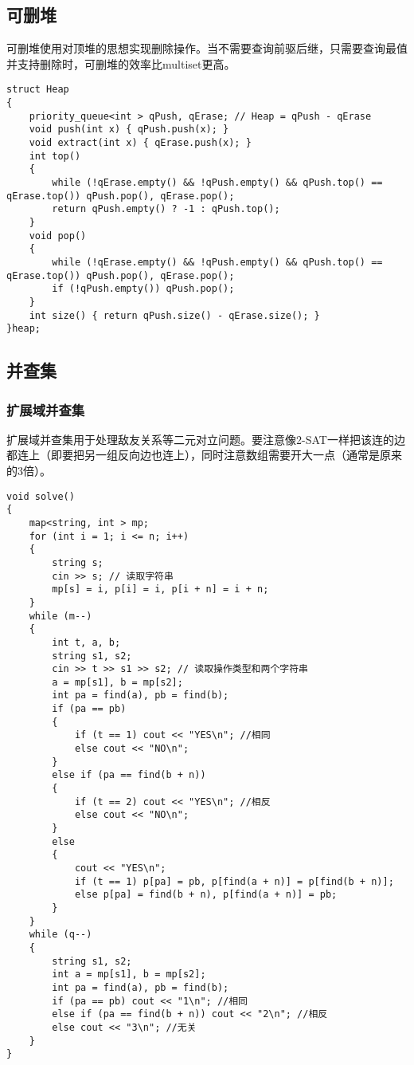 \documentclass[a4paper, fontset=none]{ctexart}
\begin{document}
\subsection{可删堆}

可删堆使用对顶堆的思想实现删除操作。当不需要查询前驱后继，只需要查询最值并支持删除时，可删堆的效率比multiset更高。
\begin{verbatim}
struct Heap
{
    priority_queue<int > qPush, qErase; // Heap = qPush - qErase
    void push(int x) { qPush.push(x); }
    void extract(int x) { qErase.push(x); }
    int top()
    {
        while (!qErase.empty() && !qPush.empty() && qPush.top() == qErase.top()) qPush.pop(), qErase.pop();
        return qPush.empty() ? -1 : qPush.top();
    }
    void pop()
    {
        while (!qErase.empty() && !qPush.empty() && qPush.top() == qErase.top()) qPush.pop(), qErase.pop();
        if (!qPush.empty()) qPush.pop();
    }
    int size() { return qPush.size() - qErase.size(); }
}heap;
\end{verbatim}
\subsection{并查集}
\subsubsection{扩展域并查集}
扩展域并查集用于处理敌友关系等二元对立问题。要注意像2-SAT一样把该连的边都连上（即要把另一组反向边也连上），同时注意数组需要开大一点（通常是原来的3倍）。
\begin{verbatim}
void solve()
{
    map<string, int > mp;
    for (int i = 1; i <= n; i++)
    {
        string s;
        cin >> s; // 读取字符串
        mp[s] = i, p[i] = i, p[i + n] = i + n;
    }
    while (m--)
    {
        int t, a, b;
        string s1, s2;
        cin >> t >> s1 >> s2; // 读取操作类型和两个字符串
        a = mp[s1], b = mp[s2];
        int pa = find(a), pb = find(b);
        if (pa == pb)
        {
            if (t == 1) cout << "YES\n"; //相同
            else cout << "NO\n";
        }
        else if (pa == find(b + n))
        {
            if (t == 2) cout << "YES\n"; //相反
            else cout << "NO\n";
        }
        else
        {
            cout << "YES\n";
            if (t == 1) p[pa] = pb, p[find(a + n)] = p[find(b + n)];
            else p[pa] = find(b + n), p[find(a + n)] = pb;
        }
    }
    while (q--)
    {
        string s1, s2;
        int a = mp[s1], b = mp[s2];
        int pa = find(a), pb = find(b);
        if (pa == pb) cout << "1\n"; //相同
        else if (pa == find(b + n)) cout << "2\n"; //相反
        else cout << "3\n"; //无关
    }
}
\end{verbatim}
\end{document}
